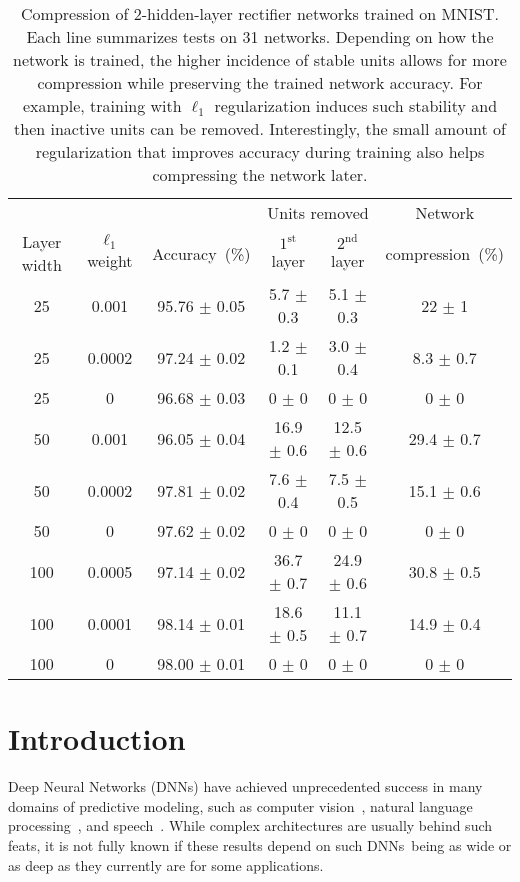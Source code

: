 \documentclass[runningheads]{llncs}
\newcommand{\dnns}{\textsc{DNN}s}
\begin{document}
\begin{table}
\caption{Compression of 2-hidden-layer rectifier networks trained on MNIST. Each line summarizes tests on 31 networks. Depending on how the network is trained, the higher incidence of stable units allows for more compression while preserving the trained network accuracy. For example, training with $\ell_1$ regularization induces such stability and then inactive units can be  removed. Interestingly, the small amount of regularization that improves accuracy during training also helps compressing the network later.}
\label{tab1}
\centering
\begin{tabular}{@{\extracolsep{6pt}}cccccc}
&&& \multicolumn{2}{c}{Units removed} &  Network \\
\cline{4-5}
Layer width & $\ell_1$ weight & Accuracy~(\%) &  $1^{\text{st}}$ layer & $2^{\text{nd}}$ layer &  compression~(\%) \\
\hline
25 & 0.001 & 95.76 $\pm$ 0.05 & 5.7 $\pm$ 0.3 & 5.1 $\pm$ 0.3 & 22 $\pm$ 1 \\ 
25 & 0.0002 & 97.24 $\pm$ 0.02 & 1.2 $\pm$ 0.1 & 3.0 $\pm$ 0.4 & 8.3 $\pm$ 0.7 \\ 
25 & 0 & 96.68 $\pm$ 0.03 & 0 $\pm$ 0 & 0 $\pm$ 0 & 0 $\pm$ 0 \\ 
\hline
50 & 0.001 & 96.05 $\pm$ 0.04 & 16.9 $\pm$ 0.6 & 12.5 $\pm$ 0.6 & 29.4 $\pm$ 0.7 \\ 
50 & 0.0002 & 97.81 $\pm$ 0.02 & 7.6 $\pm$ 0.4 & 7.5 $\pm$ 0.5 & 15.1 $\pm$ 0.6 \\ 
50 & 0 & 97.62 $\pm$ 0.02 & 0 $\pm$ 0 & 0 $\pm$ 0 & 0 $\pm$ 0 \\ 
\hline
100 & 0.0005 & 97.14 $\pm$ 0.02 & 36.7 $\pm$ 0.7 & 24.9 $\pm$ 0.6 & 30.8 $\pm$ 0.5 \\ 
100 & 0.0001 & 98.14 $\pm$ 0.01 & 18.6 $\pm$ 0.5 & 11.1 $\pm$ 0.7 & 14.9 $\pm$ 0.4 \\ 
100 & 0 & 98.00 $\pm$ 0.01 & 0 $\pm$ 0 & 0 $\pm$ 0 & 0 $\pm$ 0 \\ 
\end{tabular}
\end{table}

\section{Introduction}
    Deep Neural Networks (\dnns) have achieved unprecedented success in many domains of predictive modeling, such as computer vision~\cite{Krizhevsky2012,Ciresan2012,Goodfellow2013,Szegedy2015,He2016DeepRL}, natural language processing~\cite{sutskever2014sequence}, and speech~\cite{Hinton2012}. While complex architectures are usually behind such feats, it is not fully known if these results depend on such \dnns~being as wide or as deep as they currently are for some applications. 
    
\end{document}
